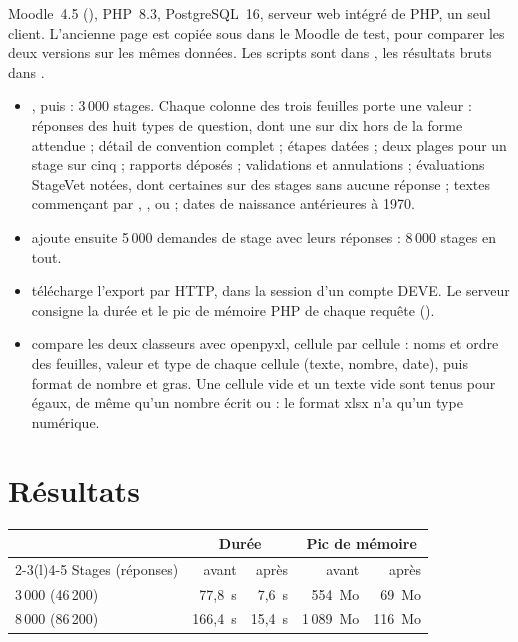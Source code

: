 \documentclass[11pt,a4paper]{article}
\begin{document}
Moodle~4.5 (), PHP~8.3, PostgreSQL~16, serveur web intégré de PHP, un
seul client. L'ancienne page est copiée sous  dans le Moodle de test, pour
comparer les deux versions sur les mêmes données. Les scripts sont dans
, les résultats bruts dans .

\begin{itemize}
  \item {}, puis  : 3\,000 stages. Chaque colonne des
    trois feuilles porte une valeur : réponses des huit types de question, dont une sur dix hors
    de la forme attendue ; détail de convention complet ; étapes datées ; deux plages pour un
    stage sur cinq ; rapports déposés ; validations et annulations ; évaluations StageVet notées,
    dont certaines sur des stages sans aucune réponse ; textes commençant par \code{=}, \code{+},
    \code{-} ou  ; dates de naissance antérieures à 1970.
  \item {} ajoute ensuite 5\,000 demandes de stage avec leurs réponses : 8\,000
    stages en tout.
  \item {} télécharge l'export par HTTP, dans la session d'un compte DEVE. Le
    serveur consigne la durée et le pic de mémoire PHP de chaque requête
    ().
  \item {} compare les deux classeurs avec openpyxl, cellule par cellule :
    noms et ordre des feuilles, valeur et type de chaque cellule (texte, nombre, date), puis format
    de nombre et gras. Une cellule vide et un texte vide sont tenus pour égaux, de même qu'un
    nombre écrit  ou  : le format xlsx n'a qu'un type numérique.
\end{itemize}

\section{Résultats}

\begin{center}
\begin{tabular}{@{}lrrrr@{}}
  \toprule
  & \multicolumn{2}{c}{Durée} & \multicolumn{2}{c}{Pic de mémoire} \\
  \cmidrule(lr){2-3}\cmidrule(l){4-5}
  Stages (réponses) & avant & après & avant & après \\
  \midrule
  3\,000 (46\,200) & 77,8~s & 7,6~s & 554~Mo & 69~Mo \\
  8\,000 (86\,200) & 166,4~s & 15,4~s & 1\,089~Mo & 116~Mo \\
  \bottomrule
\end{tabular}
\end{center}
\end{document}
